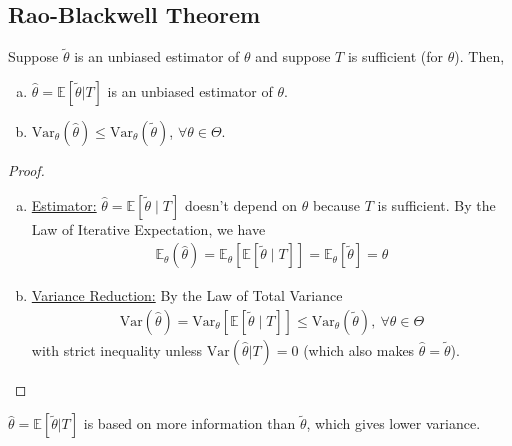 \documentclass[11pt]{elegantbook}
\begin{document}
\subsection{Rao-Blackwell Theorem}
\begin{theorem}
    \normalfont
    Suppose $\tilde{\theta}$ is an unbiased estimator of $\theta$ and suppose $T$ is sufficient (for $\theta$). Then,
    \begin{enumerate}[(a).]
        \item $\hat{\theta}=\mathbb{E}[\tilde{\theta}|T]$ is an unbiased estimator of $\theta$.
        \item $\text{Var}_\theta(\hat{\theta})\leq \text{Var}_\theta(\tilde{\theta})$, $\forall \theta\in\Theta$.
    \end{enumerate}
\end{theorem}
\begin{proof}
    \begin{enumerate}[(a).]
        \item \underline{Estimator:} $\hat{\theta}=\mathbb{E}[\tilde{\theta}\mid T]$ doesn't depend on $\theta$ because $T$ is sufficient. By the Law of Iterative Expectation, we have
        \begin{equation}
            \begin{aligned}
                \mathbb{E}_\theta(\hat{\theta})=\mathbb{E}_\theta[\mathbb{E}[\tilde{\theta}\mid T]]=\mathbb{E}_\theta[\tilde{\theta}]=\theta
            \end{aligned}
            \nonumber
        \end{equation}
        \item \underline{Variance Reduction:} By the Law of Total Variance
        \begin{equation}
            \begin{aligned}
                \text{Var}(\hat{\theta})=\text{Var}_\theta[\mathbb{E}[\tilde{\theta}\mid T]]\leq \text{Var}_\theta(\tilde{\theta}),\ \forall \theta\in \Theta
            \end{aligned}
            \nonumber
        \end{equation}
        with strict inequality unless $\text{Var}(\hat{\theta}|T)=0$ (which also makes $\hat{\theta}=\tilde{\theta}$).
    \end{enumerate}
\end{proof}
$\hat{\theta}=\mathbb{E}[\tilde{\theta}|T]$ is based on more information than $\tilde{\theta}$, which gives lower variance.
\end{document}
